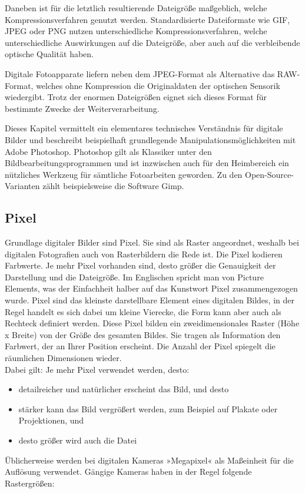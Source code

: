 \documentclass[11pt]{article}
\begin{document}
Daneben ist für die letztlich resultierende Dateigröße maßgeblich, welche Kompressionsverfahren genutzt werden. Standardisierte Dateiformate wie GIF, JPEG oder PNG nutzen unterschiedliche Kompressionsverfahren, welche unterschiedliche Auswirkungen auf die Dateigröße, aber auch auf die verbleibende optische Qualität haben.

Digitale Fotoapparate liefern neben dem JPEG-Format als Alternative das RAW-Format, welches ohne Kompression die Originaldaten der optischen Sensorik wiedergibt. Trotz der enormen Dateigrößen eignet sich dieses Format für bestimmte Zwecke der Weiterverarbeitung.

Dieses Kapitel vermittelt ein elementares technisches Verständnis für digitale Bilder und beschreibt beispielhaft grundlegende Manipulationsmöglichkeiten mit Adobe Photoshop. Photoshop gilt als Klassiker unter den Bildbearbeitungsprogrammen und ist inzwischen auch für den Heimbereich ein nützliches Werkzeug für sämtliche Fotoarbeiten geworden. Zu den Open-Source-Varianten zählt beispielsweise die Software Gimp.

\subsection{Pixel}
\label{sec:org5498432}
Grundlage digitaler Bilder sind Pixel. Sie sind als Raster angeordnet, weshalb bei digitalen Fotografien auch von Rasterbildern die Rede ist. Die Pixel kodieren Farbwerte. Je mehr Pixel vorhanden sind, desto größer die Genauigkeit der Darstellung und die Dateigröße. Im Englischen spricht man von Picture Elements, was der Einfachheit halber auf das Kunstwort Pixel zusammengezogen wurde. Pixel sind das kleinste darstellbare Element eines digitalen Bildes, in der Regel handelt es sich dabei um kleine Vierecke, die Form kann aber auch als Rechteck definiert werden. Diese Pixel bilden ein zweidimensionales Raster (Höhe x Breite) von der Größe des gesamten Bildes. Sie tragen als Information den Farbwert, der an Ihrer Position erscheint. Die Anzahl der Pixel spiegelt die räumlichen Dimensionen wieder.\\
Dabei gilt: Je mehr Pixel verwendet werden, desto:
\begin{itemize}
\item detailreicher und natürlicher erscheint das Bild, und desto
\item stärker kann das Bild vergrößert werden, zum Beispiel auf Plakate oder Projektionen, und
\item desto größer wird auch die Datei
\end{itemize}
Üblicherweise werden bei digitalen Kameras »Megapixel« als Maßeinheit für die Auflösung verwendet. Gängige Kameras haben in der Regel folgende Rastergrößen:
\end{document}
